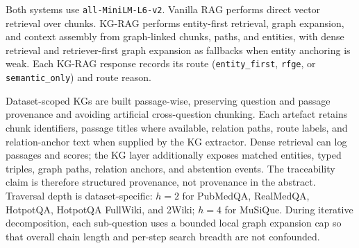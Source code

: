 Both systems use \texttt{all-MiniLM-L6-v2}.
Vanilla RAG performs direct vector retrieval over chunks.
KG-RAG performs entity-first retrieval, graph expansion, and context assembly
from graph-linked chunks, paths, and entities, with dense retrieval and
retriever-first graph expansion as fallbacks when entity anchoring is weak.
Each KG-RAG response records its route
(\texttt{entity\_first}, \texttt{rfge}, or \texttt{semantic\_only}) and route
reason.

Dataset-scoped KGs are built passage-wise, preserving question and passage
provenance and avoiding artificial cross-question chunking.
Each artefact retains chunk identifiers, passage titles where available,
relation paths, route labels, and relation-anchor text when supplied by the KG
extractor.
Dense retrieval can log passages and scores; the KG layer additionally exposes
matched entities, typed triples, graph paths, relation anchors, and abstention
events.
The traceability claim is therefore structured provenance, not provenance in
the abstract.
Traversal depth is dataset-specific: $h=2$ for PubMedQA, RealMedQA,
HotpotQA, HotpotQA FullWiki, and 2Wiki; $h=4$ for MuSiQue.
During iterative decomposition, each sub-question uses a bounded local graph
expansion cap so that overall chain length and per-step search breadth are not
confounded.
